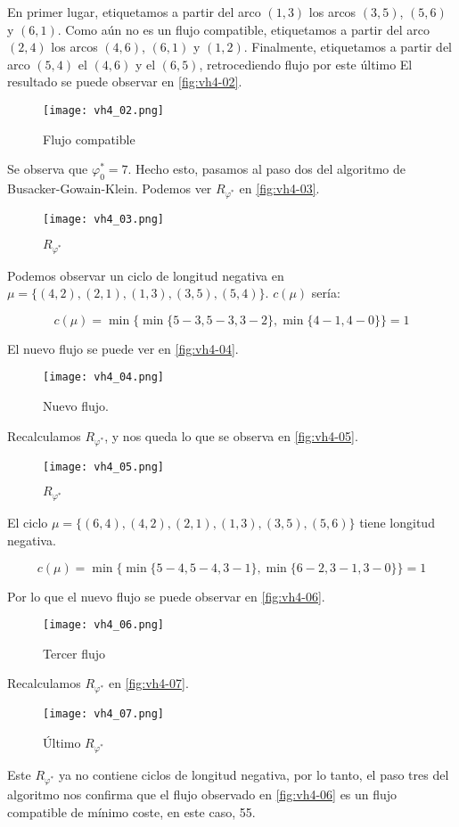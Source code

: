 \documentclass[12pt, oneside, a4paper]{article}
\begin{document}
En primer lugar, etiquetamos a partir del arco $(1,3)$ los arcos
$(3,5)$, $(5,6)$ y $(6,1)$. Como aún no es un flujo compatible, etiquetamos a
partir del arco $(2,4)$ los arcos $(4,6)$, $(6,1)$ y
$(1,2)$. Finalmente, etiquetamos a partir del arco $(5,4)$ el $(4,6)$ y
el $(6,5)$, retrocediendo flujo por este último El
resultado se puede observar en \autoref{fig:vh4-02}.

\begin{figure}[h]
\centering
\texttt{[image: vh4\_02.png]}
\caption{Flujo compatible}
\label{fig:vh4-02}
\end{figure}

Se observa que $\varphi_{0}^{*}=7$. Hecho esto, pasamos al paso dos del algoritmo de Busacker-Gowain-Klein. Podemos ver
$R_{\varphi^{*}}$ en \autoref{fig:vh4-03}.

\begin{figure}[h]
\centering
\texttt{[image: vh4\_03.png]}
\caption{$R_{\varphi^{*}}$}
\label{fig:vh4-03}
\end{figure}

Podemos observar un ciclo de longitud negativa en
$\mu=\{(4,2), (2,1), (1,3), (3,5), (5,4)\}$. $c(\mu)$ sería:

$$
c(\mu)= \min\{
\min\{5-3,5-3,3-2\},
\min\{4-1,4-0\}
\}=1
$$

El nuevo flujo se puede ver en \autoref{fig:vh4-04}.

\begin{figure}[h]
\centering
\texttt{[image: vh4\_04.png]}
\caption{Nuevo flujo.}
\label{fig:vh4-04}
\end{figure}

Recalculamos $R_{\varphi^{*}}$, y nos queda lo que se observa en
\autoref{fig:vh4-05}.

\begin{figure}[h]
\centering
\texttt{[image: vh4\_05.png]}
\caption{$R_{\varphi^{*}}$}
\label{fig:vh4-05}
\end{figure}

El ciclo $\mu=\{(6, 4), (4, 2), (2, 1), (1, 3), (3, 5), (5, 6)\}$ tiene
longitud negativa.

$$
c(\mu)= \min\{
\min\{5-4,5-4,3-1\},
\min\{6-2, 3-1, 3-0\}
\}=1
$$

Por lo que el nuevo flujo se puede observar en \autoref{fig:vh4-06}.

\begin{figure}[h]
\centering
\texttt{[image: vh4\_06.png]}
\caption{Tercer flujo}
\label{fig:vh4-06}
\end{figure}

Recalculamos $R_{\varphi^{*}}$ en \autoref{fig:vh4-07}.

\begin{figure}[h]
\centering
\texttt{[image: vh4\_07.png]}
\caption{Último $R_{\varphi^{*}}$}
\label{fig:vh4-07}
\end{figure}

Este $R_{\varphi^{*}}$ ya no contiene ciclos de longitud negativa, por
lo tanto, el paso tres del algoritmo nos confirma que el flujo
observado en \autoref{fig:vh4-06} es un flujo compatible de mínimo
coste, en este caso, 55.
\end{document}
